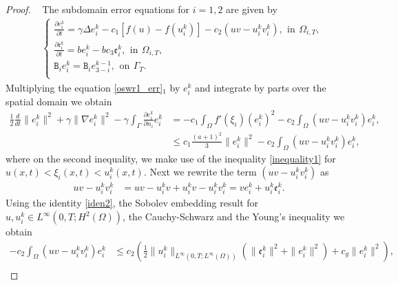 \documentclass[11pt]{article}
\begin{document}
\begin{proof}~
The subdomain error equations for $i=1, 2$ are given by
\begin{equation}\label{oswr1_err}
\begin{aligned}
&\left\{
\begin{aligned}
\frac{\partial e_i^{k}}{\partial t}  = \gamma \Delta e_i^{k} - c_1\left[ f(u)-f(u_i^{k})\right] - c_2\left( uv - u_i^{k}v_i^{k}\right), \,\ \text{in} \,\ \Omega_{i,T},\\
\frac{\partial \mathfrak{e}_i^{k}}{\partial t}  = be_i^{k} - bc_3\mathfrak{e}_i^{k} ,\,\ \text{in} \,\ \Omega_{i,T},  \\
\mathtt{B}_i e_i^{k}
 = 
\mathtt{B}_i e_{3-i}^{k-1},
\,\ \mbox{on}\,\ \Gamma_{T}.\\
\end{aligned}\right.
\end{aligned}
\end{equation}
Multiplying the equation \eqref{oswr1_err}$_1$ by $e_i^{k}$ and integrate by parts over the spatial domain we obtain 
\begin{equation}\label{err_est1}
\begin{aligned}
\frac{1}{2}\frac{d}{d t} \parallel e_i^{k}\parallel^2 + \gamma\parallel\nabla e_i^{k} \parallel^2 -\gamma\int_{\Gamma} \frac{\partial e_i^{k}}{\partial n_i} e_i^{k} & =- c_1 \int_{\Omega} f'(\xi_i) \left( e_i^{k}\right)^2 -c_2\int_{\Omega} \left( uv - u_i^{k}v_i^{k}\right)e_i^{k},\\
& \leq c_1\frac{(a+1)^2}{3} \parallel e_i^{k}\parallel^2 -c_2\int_{\Omega} \left( uv - u_i^{k}v_i^{k}\right)e_i^{k},
\end{aligned}
\end{equation}
where on the second inequality, we make use of the inequality \eqref{inequality1} for $u(x,t)< \xi_i(x,t)<u_i^{k}(x,t)$. Next we rewrite the term $\left( uv - u_i^{k}v_i^{k}\right)$ as
\begin{equation}\label{iden2}
\begin{aligned}
uv - u_i^{k}v_i^{k} & = uv- u_i^{k}v +u_i^{k}v -u_i^{k}v_i^{k} 
=  v {e}_i^{k} + u_i^{k} \mathfrak{e}_i^{k} .
\end{aligned}
\end{equation}
Using the identity \eqref{iden2}, the Sobolev embedding result for $u, u_i^{k}\in L^{\infty}(0, T; H^2(\Omega))$, the Cauchy-Schwarz and the Young's inequality we obtain 
\begin{equation}\label{err_int}
\begin{aligned}
-c_2\int_{\Omega} \left( uv - u_i^{k}v_i^{k}\right)e_i^{k} &\leq c_2\left( \frac{1}{2} \parallel u_i^{k}\parallel_{L^{\infty}(0,T;L^{\infty}(\Omega))} \left( \parallel \mathfrak{e}_i^{k}\parallel^2 + \parallel e_i^{k}\parallel^2 \right) + c_g \parallel e_i^{k}\parallel^2 \right),\\

\end{aligned}
\end{equation}
\end{proof}
\end{document}
